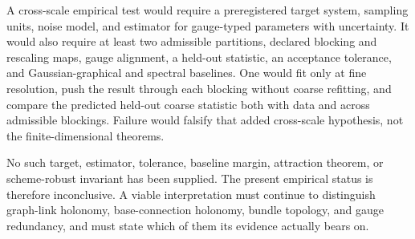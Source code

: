 A cross-scale empirical test would require a preregistered target system,
sampling units, noise model, and estimator for gauge-typed parameters with
uncertainty.  It would also require at least two admissible partitions,
declared blocking and rescaling maps, gauge alignment, a held-out statistic,
an acceptance tolerance, and Gaussian-graphical and spectral baselines.  One
would fit only at fine resolution, push the result through each blocking
without coarse refitting, and compare the predicted held-out coarse statistic
both with data and across admissible blockings.  Failure would falsify that
added cross-scale hypothesis, not the finite-dimensional theorems.

No such target, estimator, tolerance, baseline margin, attraction theorem, or
scheme-robust invariant has been supplied.  The present empirical status is
therefore inconclusive.  A viable interpretation must continue to distinguish
graph-link holonomy, base-connection holonomy, bundle topology, and gauge
redundancy, and must state which of them its evidence actually bears on.
